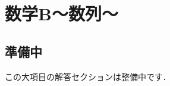 \documentclass[../../ms_a.tex]{subfiles}
\begin{document}
\section{数学B～数列～}

\subsection*{準備中}
この大項目の解答セクションは整備中です．
\end{document}
